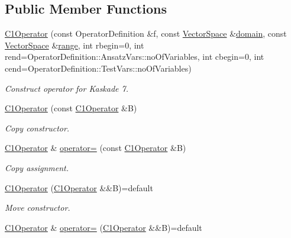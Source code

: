 \subsection*{Public Member Functions}
\begin{DoxyCompactItemize}
\item 
\hyperlink{classSpacy_1_1Kaskade_1_1C1Operator_aa31e9f54fcbb4eb6c40c1cd467d25836}{C1\+Operator} (const Operator\+Definition \&f, const \hyperlink{classSpacy_1_1VectorSpace}{Vector\+Space} \&\hyperlink{classSpacy_1_1OperatorBase_a2588f9b3e0188820c4c494e63293dc6f}{domain}, const \hyperlink{classSpacy_1_1VectorSpace}{Vector\+Space} \&\hyperlink{classSpacy_1_1OperatorBase_ab19d3b7a6f290b1079248f1e567e53d6}{range}, int rbegin=0, int rend=Operator\+Definition\+::\+Ansatz\+Vars\+::no\+Of\+Variables, int cbegin=0, int cend=Operator\+Definition\+::\+Test\+Vars\+::no\+Of\+Variables)
\begin{DoxyCompactList}\small\item\em Construct operator for Kaskade 7. \end{DoxyCompactList}\item 
\hyperlink{classSpacy_1_1Kaskade_1_1C1Operator_a69a67a899fb71e106b1371117d006659}{C1\+Operator} (const \hyperlink{classSpacy_1_1Kaskade_1_1C1Operator}{C1\+Operator} \&B)
\begin{DoxyCompactList}\small\item\em Copy constructor. \end{DoxyCompactList}\item 
\hyperlink{classSpacy_1_1Kaskade_1_1C1Operator}{C1\+Operator} \& \hyperlink{classSpacy_1_1Kaskade_1_1C1Operator_ac378b7b319e5160a7ac19a3697b4291a}{operator=} (const \hyperlink{classSpacy_1_1Kaskade_1_1C1Operator}{C1\+Operator} \&B)
\begin{DoxyCompactList}\small\item\em Copy assignment. \end{DoxyCompactList}\item 
\hyperlink{classSpacy_1_1Kaskade_1_1C1Operator_aed7bcf133fe772d9ae4b6ad5dcd5674c}{C1\+Operator} (\hyperlink{classSpacy_1_1Kaskade_1_1C1Operator}{C1\+Operator} \&\&B)=default
\begin{DoxyCompactList}\small\item\em Move constructor. \end{DoxyCompactList}\item 
\hyperlink{classSpacy_1_1Kaskade_1_1C1Operator}{C1\+Operator} \& \hyperlink{classSpacy_1_1Kaskade_1_1C1Operator_ab05b1e6565daf571d60ecf1b4584c991}{operator=} (\hyperlink{classSpacy_1_1Kaskade_1_1C1Operator}{C1\+Operator} \&\&B)=default

\end{DoxyCompactItemize}
